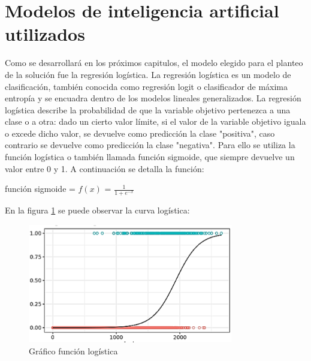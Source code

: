 \section{Modelos de inteligencia artificial utilizados}\label{sec:Modelos}

Como se desarrollará en los próximos capitulos, el modelo elegido para el planteo de la solución fue la regresión logística.
La regresión logística es un modelo de clasificación, también conocida como regresión logit o clasificador de máxima entropía y se encuadra dentro de los modelos lineales generalizados.
La regresión logística describe la probabilidad de que la variable objetivo pertenezca a una clase o a otra: dado un cierto valor límite, si el valor de la variable objetivo iguala o excede dicho valor, se devuelve como predicción la clase "positiva", caso contrario se devuelve como predicción la clase "negativa". Para ello se utiliza la función logística o también llamada función sigmoide, que siempre devuelve un valor entre 0 y 1. A continuación se detalla la función:

\begin{center}
\begin{LARGE}
función sigmoide = $f(x)$ = $\frac{1}{1+e^{-x}}$

\end{LARGE}
\end{center}

En la figura \ref{fig:funcionlog} se puede observar la curva logística:

\vspace{1cm}
\begin{figure}[htbp]
	\centering
	\includegraphics[width=0.8\textwidth]{./Figures/funcionlog.png}
	\caption{Gráfico función logística}
	\label{fig:funcionlog}
\end{figure}
\vspace{1cm}

\vspace{1cm}

